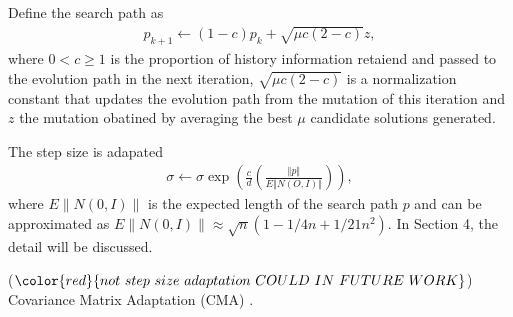 Define the search path as 
\begin{align}
p_{k+1} \leftarrow (1-c)p_k + \sqrt{\mu c (2-c)} z,
\end{align}
where $0<c \geq 1$ is the proportion of history information retaiend and passed to the evolution path in the next iteration, $ \sqrt{\mu c (2-c)}$ is a normalization constant that updates the evolution path from the mutation of this iteration and $z$ the mutation obatined by averaging the best $\mu$ candidate solutions generated. 

The step size is adapated 
\begin{align}
\sigma \leftarrow \sigma \exp \left (  \frac{c}{d}  \left( \frac{\Vert p\Vert}{E \Vert N(O,I)\Vert } \right) \right ),
\end{align}
where $E\| N(0,I) \|$ is the expected length of the search path $p$ and can be approximated as $E\| N(0,I) \| \approx \sqrt{n} (1-1/4n + 1/21n^2)$. In Section 4, the detail will be discussed.



($\color{red}{not\ step\ size\ adaptation\ COULD\ IN\ FUTURE\ WORK}$) Covariance Matrix Adaptation (CMA) \cite{Hansen:2003:RTC:772374.772376}. 







